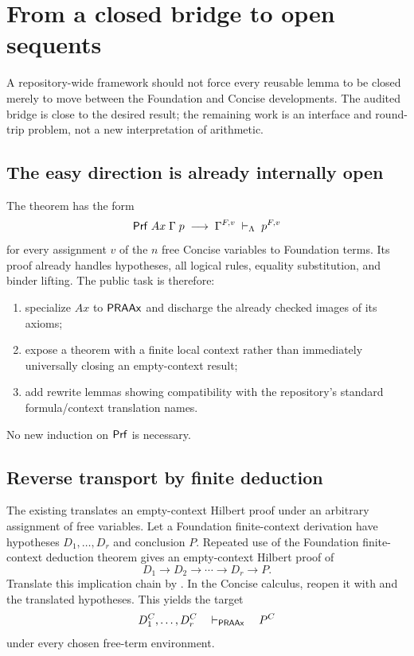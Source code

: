 \section{From a closed bridge to open sequents}
\label{sec:bridge}

A repository-wide framework should not force every reusable lemma to be closed
merely to move between the Foundation and Concise developments.  The audited
bridge is close to the desired result; the remaining work is an interface and
round-trip problem, not a new interpretation of arithmetic.

\subsection{The easy direction is already internally open}

The theorem
 has the form
\[
 \mathsf{Prf}\;Ax\;\Gamma\;p
 \;\longrightarrow\;
 \Gamma^{F,v}\;\vdash_{\Lambda}\;p^{F,v}
\]
for every assignment \(v\) of the \(n\) free Concise variables to Foundation
terms.  Its proof already handles hypotheses, all logical rules, equality
substitution, and binder lifting.  The public task is therefore:
\begin{enumerate}[label=(\alph*)]
\item specialize \(Ax\) to \(\mathsf{PRAAx}\) and discharge the already checked images
      of its axioms;
\item expose a theorem with a finite local context rather than immediately
      universally closing an empty-context result;
\item add rewrite lemmas showing compatibility with the repository's standard
      formula/context translation names.
\end{enumerate}
No new induction on \(\mathsf{Prf}\) is necessary.

\subsection{Reverse transport by finite deduction}

The existing  translates an empty-context Hilbert proof
under an arbitrary assignment of free variables.  Let a Foundation
finite-context derivation have hypotheses
\(D_1,\ldots,D_r\) and conclusion \(P\).  Repeated use of the Foundation
finite-context deduction theorem gives an empty-context Hilbert proof of
\[
       D_1\to D_2\to\cdots\to D_r\to P.
\]
Translate this implication chain by .  In the Concise
calculus, reopen it with  and the translated hypotheses.  This
yields the target
\[
  D_1^C,\ldots,D_r^C\quad\mathrel{\vdash_{\mathsf{PRAAx}}}\quad P^C
\]
under every chosen free-term environment.

